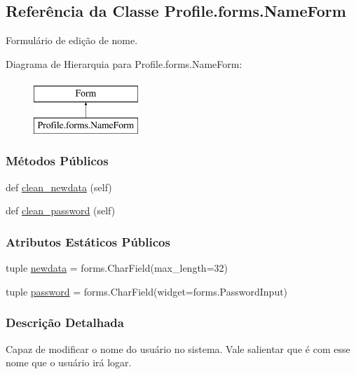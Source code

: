 \hypertarget{classProfile_1_1forms_1_1NameForm}{}\subsection{Referência da Classe Profile.\+forms.\+Name\+Form}
\label{classProfile_1_1forms_1_1NameForm}


Formulário de edição de nome.  


Diagrama de Hierarquia para Profile.\+forms.\+Name\+Form\+:\begin{figure}[H]
\begin{center}
\leavevmode
\includegraphics[height=2.000000cm]{d6/d33/classProfile_1_1forms_1_1NameForm}
\end{center}
\end{figure}
\subsubsection*{Métodos Públicos}
\begin{DoxyCompactItemize}
\item 
def \hyperlink{classProfile_1_1forms_1_1NameForm_a3feb3d340b4c8b18b55bcfa0a91758c1}{clean\+\_\+newdata} (self)
\item 
def \hyperlink{classProfile_1_1forms_1_1NameForm_aa4cc0c75c2f47602302780502b7c20a0}{clean\+\_\+password} (self)
\end{DoxyCompactItemize}
\subsubsection*{Atributos Estáticos Públicos}
\begin{DoxyCompactItemize}
\item 
tuple \hyperlink{classProfile_1_1forms_1_1NameForm_a6ebfb316b263c162dd3895b1da149eda}{newdata} = forms.\+Char\+Field(max\+\_\+length=32)
\item 
tuple \hyperlink{classProfile_1_1forms_1_1NameForm_a5a6959db0132c607a56f9cda75769ecf}{password} = forms.\+Char\+Field(widget=forms.\+Password\+Input)
\end{DoxyCompactItemize}


\subsubsection{Descrição Detalhada}
Capaz de modificar o nome do usuário no sistema. Vale salientar que é com esse nome que o usuário irá logar. 

